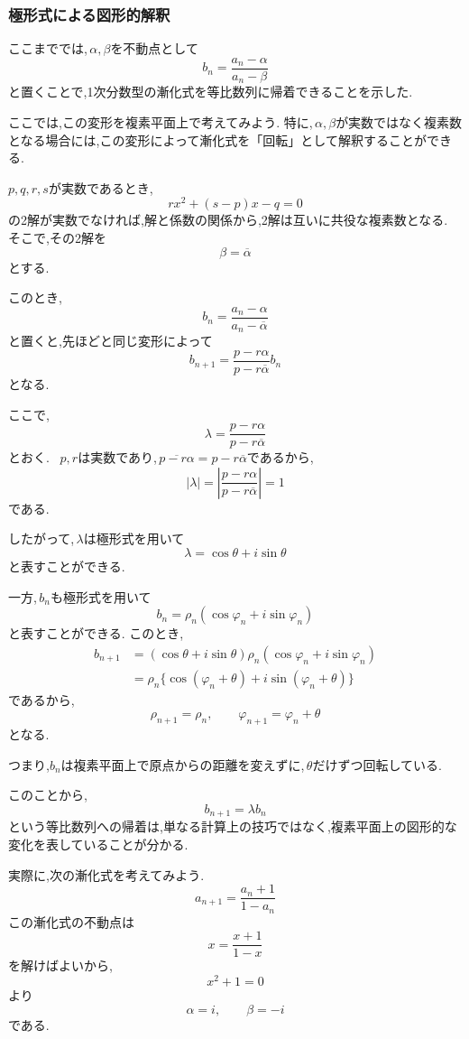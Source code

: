 
\subsubsection{極形式による図形的解釈}
  ここまででは,\,$\alpha,\beta$を不動点として
  \[
    b_n=\frac{a_n-\alpha}{a_n-\beta}
  \]
  と置くことで,1次分数型の漸化式を等比数列に帰着できることを示した.

  ここでは,この変形を複素平面上で考えてみよう.
  特に,\,$\alpha,\beta$が実数ではなく複素数となる場合には,この変形によって漸化式を「回転」として解釈することができる.

  $p,q,r,s$が実数であるとき,
  \[
    rx^2+(s-p)x-q=0
  \]
  の2解が実数でなければ,解と係数の関係から,2解は互いに共役な複素数となる.
  そこで,その2解を
  \[
    \beta=\overline{\alpha}
  \]
  とする.

  このとき,
  \[
    b_n=\frac{a_n-\alpha}{a_n-\overline{\alpha}}
  \]
  と置くと,先ほどと同じ変形によって
  \[
    b_{n+1}
    =
    \frac{p-r\alpha}{p-r\overline{\alpha}}b_n
  \]
  となる.

  ここで,
  \[
    \lambda=\frac{p-r\alpha}{p-r\overline{\alpha}}
  \]
  とおく.
  \, $p,r$は実数であり,\,$\overline{p-r\alpha}=p-r\overline{\alpha}$であるから,
  \[
    |\lambda|
    =
    \left|
    \frac{p-r\alpha}{p-r\overline{\alpha}}
    \right|
    =1
  \]
  である.

  したがって,\,$\lambda$は極形式を用いて
  \[
    \lambda=\cos\theta+i\sin\theta
  \]
  と表すことができる.

  一方,\,$b_n$も極形式を用いて
  \[
    b_n=\rho_n(\cos\varphi_n+i\sin\varphi_n)
  \]
  と表すことができる.
  このとき,
  \begin{align*}
    b_{n+1}
    &=
    (\cos\theta+i\sin\theta)
    \rho_n(\cos\varphi_n+i\sin\varphi_n)\\
    &=
    \rho_n
    \{\cos(\varphi_n+\theta)
    +i\sin(\varphi_n+\theta)\}
  \end{align*}
  であるから,
  \[
    \rho_{n+1}=\rho_n,
    \qquad
    \varphi_{n+1}=\varphi_n+\theta
  \]
  となる.

  つまり,$b_n$は複素平面上で原点からの距離を変えずに,\,$\theta$だけずつ回転している.

  このことから,
  \[
    b_{n+1}=\lambda b_n
  \]
  という等比数列への帰着は,単なる計算上の技巧ではなく,複素平面上の図形的な変化を表していることが分かる.

  実際に,次の漸化式を考えてみよう.
  \[
    a_{n+1}=\frac{a_n+1}{1-a_n}
  \]
  この漸化式の不動点は
  \[
    x=\frac{x+1}{1-x}
  \]
  を解けばよいから,
  \[
    x^2+1=0
  \]
  より
  \[
    \alpha=i,\qquad\beta=-i
  \]
  である.

